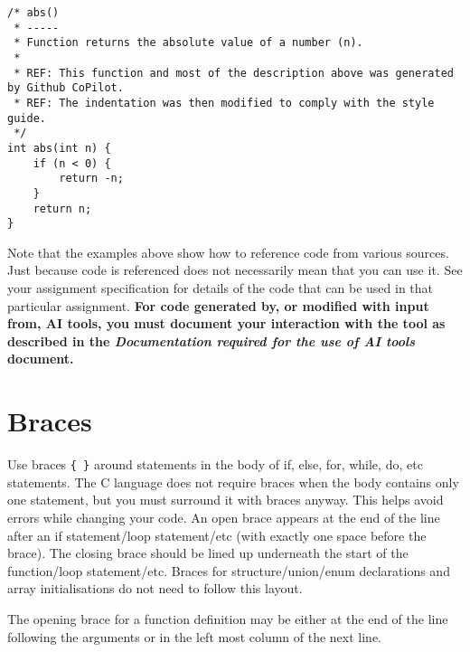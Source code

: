 \documentclass{article}
\begin{document}
\begin{lstlisting}
/* abs()
 * -----
 * Function returns the absolute value of a number (n).
 *
 * REF: This function and most of the description above was generated by Github CoPilot.
 * REF: The indentation was then modified to comply with the style guide.
 */
int abs(int n) {
    if (n < 0) {
        return -n;
    }
    return n;
}
\end{lstlisting}

\linenumbers

Note that the examples above show how to reference code from various sources. Just because code is referenced
does not necessarily mean that you can use it. See your assignment specification for details of the code that can
be used in that particular assignment. \textbf{For code generated by, or modified with input from, AI tools, you must
document your interaction with the tool as described in the \textit{Documentation required for the use of AI tools} document.}

\section{Braces}
Use braces \texttt{\{ \}} around statements in the body of if, else, for, while, do, etc statements.
The C language does not require braces when the body contains only one statement, but you must 
surround it with braces anyway.
This helps avoid errors while changing your code.
An open brace appears at the end of the line after an if statement/loop statement/etc (with exactly 
one space before the brace).
The closing brace should be lined up underneath the start of the function/loop statement/etc.
Braces for structure/union/enum declarations and array initialisations do not need to follow this layout.

The opening brace for a function definition may be either at the end of the line following the 
arguments or in the left most column of the next line.
\end{document}
